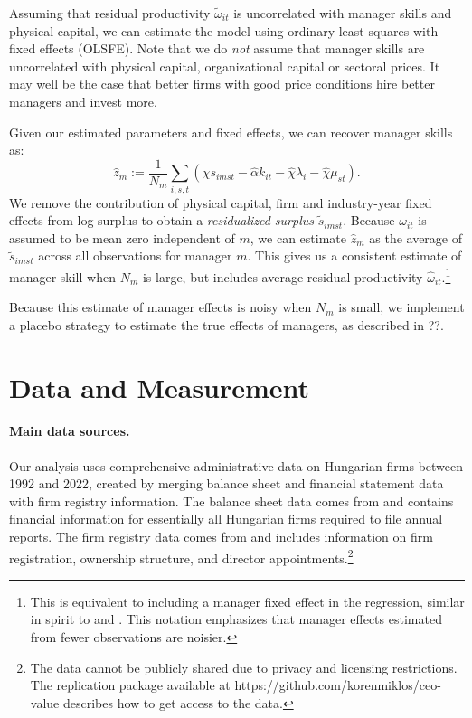 \documentclass[11pt,a4paper]{article}
\begin{document}
Assuming that residual productivity $\tilde\omega_{it}$ is uncorrelated with manager skills and physical capital, we can estimate the model using ordinary least squares with fixed effects (OLSFE). Note that we do \emph{not} assume that manager skills are uncorrelated with physical capital, organizational capital or sectoral prices. It may well be the case that better firms with good price conditions hire better managers and invest more. 

Given our estimated parameters and fixed effects, we can recover manager skills as:
\begin{equation}\label{eq:estimated}
\hat z_m :=
\frac1{N_m}\sum_{i,s,t}(
        \hat\chi s_{imst} -  \hat\alpha k_{it}  -\hat\chi \lambda_i -\hat\chi \mu_{st}
). 
\end{equation}
We remove the contribution of physical capital, firm and industry-year fixed effects from log surplus to obtain a \emph{residualized surplus} $\tilde s_{imst}$. Because $\omega_{it}$ is assumed to be mean zero independent of $m$, we can estimate $\hat z_m$ as the average of $\tilde s_{imst}$ across all observations for manager $m$. This gives us a consistent estimate of manager skill when $N_m$ is large, but includes average residual productivity $\hat\omega_{it}$.\footnote{This is equivalent to including a manager fixed effect in the regression, similar in spirit to \citet{Abowd1999Econometrica} and \citet{Card2018JoLE}. This notation emphasizes that manager effects estimated from fewer observations are noisier.}

Because this estimate of manager effects is noisy when $N_m$ is small, we implement a placebo strategy to estimate the true effects of managers, as described in ??.

\section{Data and Measurement}
\paragraph{Main data sources.} Our analysis uses comprehensive administrative data on Hungarian firms between 1992 and 2022, created by merging balance sheet and financial statement data with firm registry information. The balance sheet data comes from \citet{merleg2024} and contains financial information for essentially all Hungarian firms required to file annual reports. The firm registry data comes from \citet{cegjegyzek2024} and includes information on firm registration, ownership structure, and director appointments.\footnote{The data cannot be publicly shared due to privacy and licensing restrictions. The replication package available at https://github.com/korenmiklos/ceo-value describes how to get access to the data.}
\end{document}
